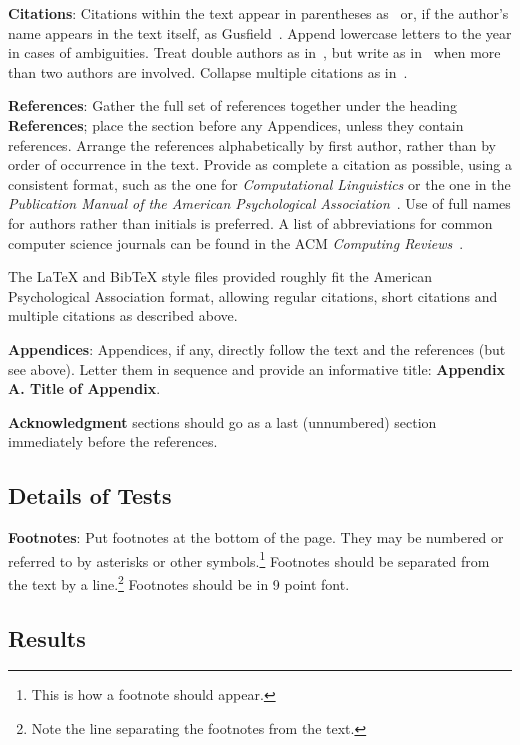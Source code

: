 \documentclass[11pt,letterpaper]{article}
\begin{document}
{\bf Citations}: Citations within the text appear
in parentheses as~\cite{Gusfield:97} or, if the author's name appears in
the text itself, as Gusfield~. 
Append lowercase letters to the year in cases of ambiguities.  
Treat double authors as in~\cite{Aho:72}, but write as 
in~\cite{Chandra:81} when more than two authors are involved. 
Collapse multiple citations as in~\cite{Gusfield:97,Aho:72}.

\textbf{References}: Gather the full set of references together under
the heading {\bf References}; place the section before any Appendices,
unless they contain references. Arrange the references alphabetically
by first author, rather than by order of occurrence in the text.
Provide as complete a citation as possible, using a consistent format,
such as the one for {\em Computational Linguistics\/} or the one in the 
{\em Publication Manual of the American 
Psychological Association\/}~\cite{APA:83}.  Use of full names for
authors rather than initials is preferred.  A list of abbreviations
for common computer science journals can be found in the ACM 
{\em Computing Reviews\/}~\cite{ACM:83}.

The \LaTeX{} and Bib\TeX{} style files provided roughly fit the
American Psychological Association format, allowing regular citations, 
short citations and multiple citations as described above.

{\bf Appendices}: Appendices, if any, directly follow the text and the
references (but see above).  Letter them in sequence and provide an
informative title: {\bf Appendix A. Title of Appendix}.

\textbf{Acknowledgment} sections should go as a last (unnumbered) section immediately
before the references.  

\subsection{Details of Tests}

{\bf Footnotes}: Put footnotes at the bottom of the page. They may
be numbered or referred to by asterisks or other
symbols.\footnote{This is how a footnote should appear.} Footnotes
should be separated from the text by a line.\footnote{Note the
line separating the footnotes from the text.}  Footnotes should be in 9 point font.

\subsection{Results}
\end{document}
